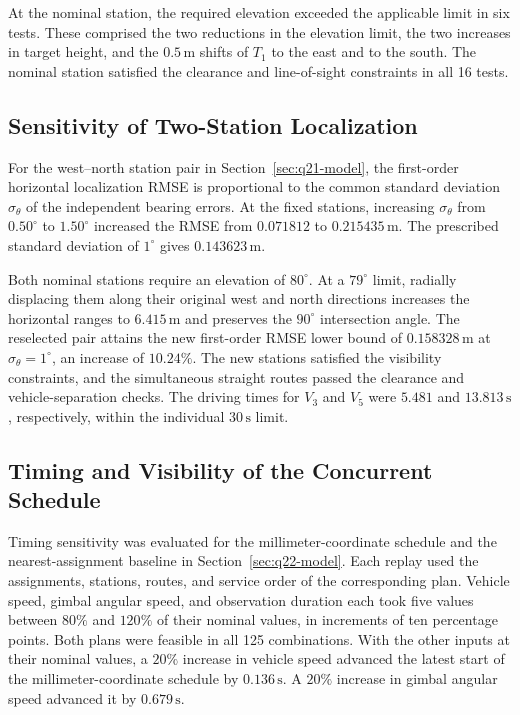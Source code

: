 \documentclass{swmcmthesis}
\begin{document}
At the nominal station, the required elevation exceeded the applicable limit in six tests. These comprised the two reductions in the elevation limit, the two increases in target height, and the \(0.5\,\mathrm m\) shifts of \(T_1\) to the east and to the south. The nominal station satisfied the clearance and line-of-sight constraints in all 16 tests.

\subsection{Sensitivity of Two-Station Localization}

For the west--north station pair in Section~\ref{sec:q21-model}, the first-order horizontal localization RMSE is proportional to the common standard deviation \(\sigma_\theta\) of the independent bearing errors. At the fixed stations, increasing \(\sigma_\theta\) from \(0.50^\circ\) to \(1.50^\circ\) increased the RMSE from \(0.071812\) to \(0.215435\,\mathrm m\). The prescribed standard deviation of \(1^\circ\) gives \(0.143623\,\mathrm m\).

Both nominal stations require an elevation of \(80^\circ\). At a \(79^\circ\) limit, radially displacing them along their original west and north directions increases the horizontal ranges to \(6.415\,\mathrm m\) and preserves the \(90^\circ\) intersection angle. The reselected pair attains the new first-order RMSE lower bound of \(0.158328\,\mathrm m\) at \(\sigma_\theta=1^\circ\), an increase of \(10.24\%\). The new stations satisfied the visibility constraints, and the simultaneous straight routes passed the clearance and vehicle-separation checks. The driving times for \(V_3\) and \(V_5\) were \(5.481\) and \(13.813\,\mathrm s\), respectively, within the individual \(30\,\mathrm s\) limit.

\subsection{Timing and Visibility of the Concurrent Schedule}

Timing sensitivity was evaluated for the millimeter-coordinate schedule and the nearest-assignment baseline in Section~\ref{sec:q22-model}. Each replay used the assignments, stations, routes, and service order of the corresponding plan. Vehicle speed, gimbal angular speed, and observation duration each took five values between \(80\%\) and \(120\%\) of their nominal values, in increments of ten percentage points. Both plans were feasible in all 125 combinations. With the other inputs at their nominal values, a \(20\%\) increase in vehicle speed advanced the latest start of the millimeter-coordinate schedule by \(0.136\,\mathrm s\). A \(20\%\) increase in gimbal angular speed advanced it by \(0.679\,\mathrm s\).
\end{document}
